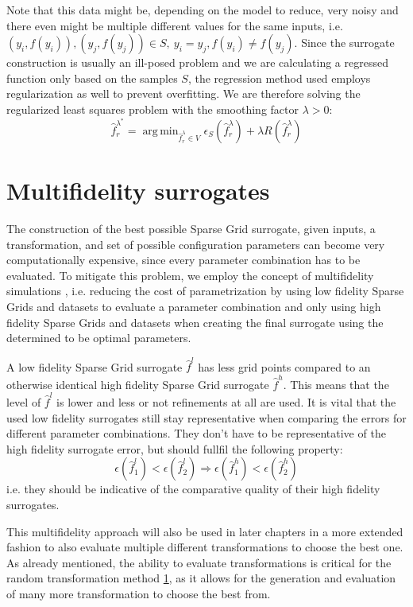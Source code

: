 \documentclass[
  a4paper,  %
  twoside,  %
  bibliography=totoc,
  headsepline,
  cleardoublepage=empty,
  parskip=half,
  draft=false
]{scrbook}
\DeclareMathOperator*{\argmin}{arg\,min}
\begin{document}
Note that this data might be, depending on the model to reduce, very noisy and there even might be multiple different values for the same inputs, i.e. $(y_i,f(y_i)), (y_j,f(y_j)) \in S, ~ y_i=y_j, f(y_i) \neq f(y_j)$.
Since the surrogate construction is usually an ill-posed problem and we are calculating a regressed function only based on the samples $S$, the regression method used employs regularization as well to prevent overfitting.
We are therefore solving the regularized least squares problem with the smoothing factor $\lambda > 0$:
\begin{equation}
\hat{f}_r^{\lambda^*} = \argmin_{\hat{f}_r^\lambda \in V} \epsilon_{S}(\hat{f}_r^\lambda) + \lambda R(\hat{f}_r^\lambda)
\end{equation}

\section{Multifidelity surrogates}

The construction of the best possible Sparse Grid surrogate, given inputs, a transformation, and set of possible configuration parameters can become very computationally expensive, since every parameter combination has to be evaluated.
To mitigate this problem, we employ the concept of multifidelity simulations \cite{}, i.e. reducing the cost of parametrization by using low fidelity Sparse Grids and datasets to evaluate a parameter combination and only using high fidelity Sparse Grids and datasets when creating the final surrogate using the determined to be optimal parameters.

A low fidelity Sparse Grid surrogate $\hat{f}^l$ has less grid points compared to an otherwise identical high fidelity Sparse Grid surrogate $\hat{f}^h$.
This means that the level of $\hat{f}^l$ is lower and less or not refinements at all are used.
It is vital that the used low fidelity surrogates still stay representative when comparing the errors for different parameter combinations.
They don't have to be representative of the high fidelity surrogate error, but should fullfil the following property:
\begin{equation}
\epsilon(\hat{f}_1^l) < \epsilon(\hat{f}_2^l) \Rightarrow \epsilon(\hat{f}_1^h) < \epsilon(\hat{f}_2^h)
\end{equation}
i.e. they should be indicative of the comparative quality of their high fidelity surrogates.

This multifidelity approach will also be used in later chapters in a more extended fashion to also evaluate multiple different transformations to choose the best one.
As already mentioned, the ability to evaluate transformations is critical for the random transformation method \ref{}, as it allows for the generation and evaluation of many more transformation to choose the best from.
\end{document}
